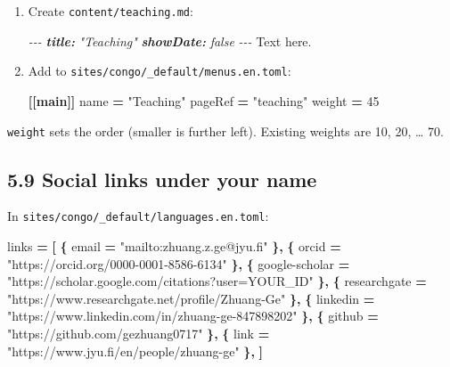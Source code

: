 \documentclass[
  10pt,
]{article}
\newenvironment{Shaded}{\begin{snugshade}}{\end{snugshade}}
\newcommand{\AnnotationTok}[1]{\textcolor[rgb]{0.56,0.35,0.01}{\textbf{\textit{#1}}}}
\newcommand{\CommentTok}[1]{\textcolor[rgb]{0.56,0.35,0.01}{\textit{#1}}}
\newcommand{\DataTypeTok}[1]{\textcolor[rgb]{0.13,0.29,0.53}{#1}}
\newcommand{\DecValTok}[1]{\textcolor[rgb]{0.00,0.00,0.81}{#1}}
\newcommand{\KeywordTok}[1]{\textcolor[rgb]{0.13,0.29,0.53}{\textbf{#1}}}
\newcommand{\NormalTok}[1]{#1}
\newcommand{\OperatorTok}[1]{\textcolor[rgb]{0.81,0.36,0.00}{\textbf{#1}}}
\newcommand{\StringTok}[1]{\textcolor[rgb]{0.31,0.60,0.02}{#1}}
\begin{document}
\begin{enumerate}
\def\labelenumi{\arabic{enumi}.}
\item
  Create \texttt{content/teaching.md}:

\begin{Shaded}
\begin{Highlighting}[]
\CommentTok{{-}{-}{-}}
\AnnotationTok{title:}\CommentTok{ "Teaching"}
\AnnotationTok{showDate:}\CommentTok{ false}
\CommentTok{{-}{-}{-}}
\NormalTok{Text here.}
\end{Highlighting}
\end{Shaded}
\item
  Add to \texttt{sites/congo/\_default/menus.en.toml}:

\begin{Shaded}
\begin{Highlighting}[]
\KeywordTok{[[main]]}
  \DataTypeTok{name} \OperatorTok{=} \StringTok{"Teaching"}
  \DataTypeTok{pageRef} \OperatorTok{=} \StringTok{"teaching"}
  \DataTypeTok{weight} \OperatorTok{=} \DecValTok{45}
\end{Highlighting}
\end{Shaded}
\end{enumerate}

\texttt{weight} sets the order (smaller is further left). Existing
weights are 10, 20, \ldots{} 70.

\hypertarget{social-links-under-your-name}{%
\subsection{5.9 Social links under your
name}\label{social-links-under-your-name}}

In \texttt{sites/congo/\_default/languages.en.toml}:

\begin{Shaded}
\begin{Highlighting}[]
  \DataTypeTok{links} \OperatorTok{=} \OperatorTok{[}
    \OperatorTok{\{ }\DataTypeTok{email}\OperatorTok{ =} \StringTok{"mailto:zhuang.z.ge@jyu.fi"}\OperatorTok{ \},}
    \OperatorTok{\{ }\DataTypeTok{orcid}\OperatorTok{ =} \StringTok{"https://orcid.org/0000{-}0001{-}8586{-}6134"}\OperatorTok{ \},}
    \OperatorTok{\{ }\DataTypeTok{google{-}scholar}\OperatorTok{ =} \StringTok{"https://scholar.google.com/citations?user=YOUR\_ID"}\OperatorTok{ \},}
    \OperatorTok{\{ }\DataTypeTok{researchgate}\OperatorTok{ =} \StringTok{"https://www.researchgate.net/profile/Zhuang{-}Ge"}\OperatorTok{ \},}
    \OperatorTok{\{ }\DataTypeTok{linkedin}\OperatorTok{ =} \StringTok{"https://www.linkedin.com/in/zhuang{-}ge{-}847898202"}\OperatorTok{ \},}
    \OperatorTok{\{ }\DataTypeTok{github}\OperatorTok{ =} \StringTok{"https://github.com/gezhuang0717"}\OperatorTok{ \},}
    \OperatorTok{\{ }\DataTypeTok{link}\OperatorTok{ =} \StringTok{"https://www.jyu.fi/en/people/zhuang{-}ge"}\OperatorTok{ \},}
  \OperatorTok{]}
\end{Highlighting}
\end{Shaded}
\end{document}
